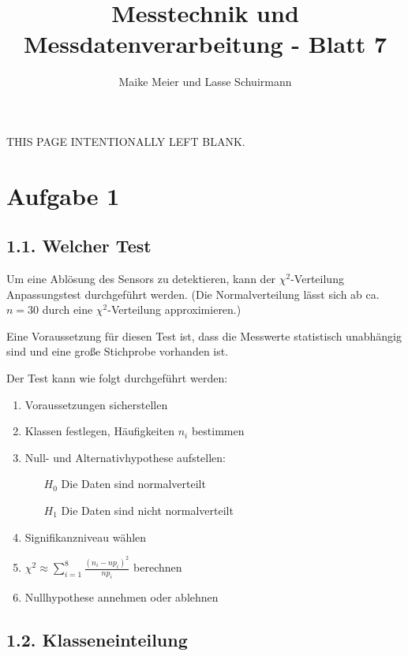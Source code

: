 \documentclass[12pt,a4paper]{article}
\author{Maike Meier und Lasse Schuirmann}
\title{Messtechnik und Messdatenverarbeitung - Blatt 7}
\newcommand*{\blankpage}{
  \vspace*{\fill}
  \begin{flushright}
  \tiny THIS PAGE INTENTIONALLY LEFT BLANK.
  \end{flushright}
  \pagebreak
}
\begin{document}

\maketitle
\pagebreak

\blankpage

\section*{Aufgabe 1}
\subsection*{1.1. Welcher Test}
Um eine Ablösung des Sensors zu detektieren, kann der $\chi^2$-Verteilung Anpassungstest durchgeführt werden. (Die Normalverteilung lässt sich ab ca. $n=30$ durch eine $\chi^2$-Verteilung approximieren.)

Eine Voraussetzung für diesen Test ist, dass die Messwerte statistisch unabhängig sind und eine große Stichprobe vorhanden ist.

Der Test kann wie folgt durchgeführt werden:

\begin{enumerate}
\item Voraussetzungen sicherstellen
\item Klassen festlegen, Häufigkeiten $n_i$ bestimmen
\item Null- und Alternativhypothese aufstellen:
\begin{itemize}
 \item[$H_0$] Die Daten sind normalverteilt
 \item[$H_1$] Die Daten sind nicht normalverteilt
\end{itemize}
\item Signifikanzniveau wählen
\item $\chi^2 \approx \sum\limits_{i=1}^8 \frac{(n_i -n p_i)^2}{n p_i}$ berechnen
\item Nullhypothese annehmen oder ablehnen
\end{enumerate}

\subsection*{1.2. Klasseneinteilung}
\end{document}
